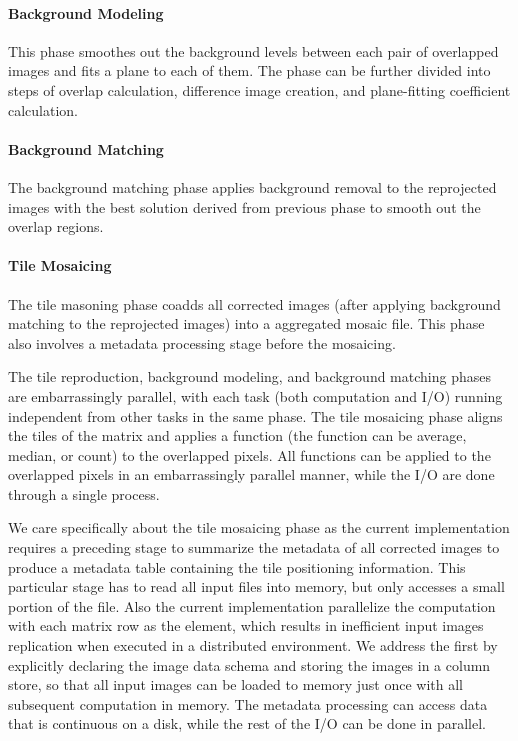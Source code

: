 \documentclass{acm_proc_article-sp}
\begin{document}
\paragraph{Background Modeling}
This phase smoothes out the background levels between each pair of overlapped images and fits a plane to each of them. The phase can be further divided into steps of overlap calculation, difference image creation, and plane-fitting coefficient calculation.

\paragraph{Background Matching}
The background matching phase applies background removal to the reprojected images with the best solution derived from previous phase to smooth out the overlap regions.

\paragraph{Tile Mosaicing}
The tile masoning phase coadds all corrected images (after applying background matching to the reprojected images) into a aggregated mosaic file. This phase also involves a metadata processing stage before the mosaicing.

The tile reproduction, background modeling, and background matching phases are embarrassingly parallel, with each task (both computation and I/O) running independent from other tasks in the same phase. The tile mosaicing phase aligns the tiles of the matrix and applies a function (the function can be average, median, or count) to the overlapped pixels. All functions can be applied to the overlapped pixels in an embarrassingly parallel manner, while the I/O are done through a single process.

We care specifically about the tile mosaicing phase as the current implementation requires a preceding stage to summarize the metadata of all corrected images to produce a metadata table containing the tile positioning information. This particular stage has to read all input files into memory, but only accesses a small portion of the file. Also the current implementation parallelize the computation with each matrix row as the element, which results in inefficient input images replication when executed in a distributed environment. We address the first by explicitly declaring the image data schema and storing the images in a column store, so that all input images can be loaded to memory just once with all subsequent computation in memory. The metadata processing can access data that is continuous on a disk, while the rest of the I/O can be done in parallel.
\end{document}
